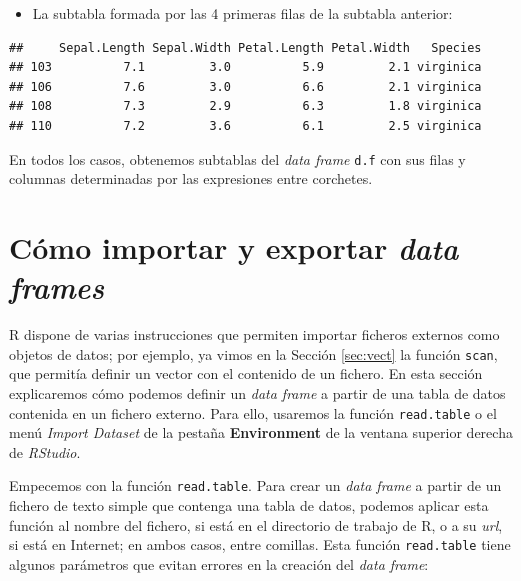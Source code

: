 \documentclass[]{book}
\newenvironment{Shaded}{\begin{snugshade}}{\end{snugshade}}
\newcommand{\DecValTok}[1]{\textcolor[rgb]{0.00,0.00,0.81}{#1}}
\newcommand{\NormalTok}[1]{#1}
\newcommand{\OperatorTok}[1]{\textcolor[rgb]{0.81,0.36,0.00}{\textbf{#1}}}
\newcommand{\StringTok}[1]{\textcolor[rgb]{0.31,0.60,0.02}{#1}}
\providecommand{\tightlist}{%
  \setlength{\itemsep}{0pt}\setlength{\parskip}{0pt}}
\theoremstyle{definition}
\theoremstyle{definition}
\theoremstyle{definition}
\theoremstyle{remark}
\begin{document}
\begin{itemize}
\tightlist
\item
  La subtabla formada por las 4 primeras filas de la subtabla anterior:
\end{itemize}

\begin{Shaded}
\end{Shaded}

\begin{verbatim}
##     Sepal.Length Sepal.Width Petal.Length Petal.Width   Species
## 103          7.1         3.0          5.9         2.1 virginica
## 106          7.6         3.0          6.6         2.1 virginica
## 108          7.3         2.9          6.3         1.8 virginica
## 110          7.2         3.6          6.1         2.5 virginica
\end{verbatim}

En todos los casos, obtenemos subtablas del \emph{data frame} \texttt{d.f} con sus filas y columnas determinadas por las expresiones entre corchetes.

\hypertarget{como-importar-y-exportar-data-frames}{%
\section{\texorpdfstring{Cómo importar y exportar \emph{data frames}}{Cómo importar y exportar data frames}}\label{como-importar-y-exportar-data-frames}}

R dispone de varias instrucciones que permiten importar ficheros externos como objetos de datos; por ejemplo, ya vimos en la Sección \ref{sec:vect} la función \texttt{scan}, que permitía definir un vector con el contenido de un fichero. En esta sección explicaremos cómo podemos definir un \emph{data frame} a partir de una tabla de datos contenida en un fichero externo. Para ello, usaremos la función \texttt{read.table} o el menú \emph{Import Dataset} de la pestaña \textbf{Environment} de la ventana superior derecha de \emph{RStudio}.

Empecemos con la función \texttt{read.table}. Para crear un \emph{data frame} a partir de un fichero de texto simple que contenga una tabla de datos, podemos aplicar esta función al nombre del fichero, si está en el directorio de trabajo de R, o a su \emph{url}, si está en Internet; en ambos casos, entre comillas. Esta función \texttt{read.table} tiene algunos parámetros que evitan errores en la creación del \emph{data frame}:
\end{document}
